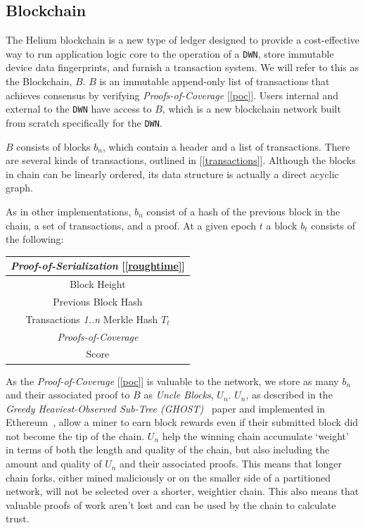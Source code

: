 \documentclass[letterpaper,11pt]{article}
\begin{document}
\subsection{Blockchain}

The Helium blockchain is a new type of ledger designed to provide a cost-effective way to run application logic core to the operation of a \verb|DWN|, store immutable device data fingerprints, and furnish a transaction system. We will refer to this as the Blockchain, $\mathit{B}$. $\mathit{B}$ is an immutable append-only list of transactions that achieves consensus by verifying \emph{Proofs-of-Coverage} [\ref{poc}]. Users internal and external to the \verb|DWN| have access to $\mathit{B}$, which is a new blockchain network built from scratch specifically for the \verb|DWN|.\newline

$\mathit{B}$ consists of blocks $\mathit{b_n}$, which contain a header and a list of transactions. There are several kinds of transactions, outlined in [\ref{transactions}]. Although the blocks in chain can be linearly ordered, its data structure is actually a direct acyclic graph.\newline

As in other implementations, $\mathit{b_n}$ consist of a hash of the previous block in the chain, a set of transactions, and a proof. At a given epoch $\mathit{t}$ a block $\mathit{b_t}$ consists of the following:

\begin{center}
	\begin{tabular}{|c|}
		\hline
		 \emph{Proof-of-Serialization} [\ref{roughtime}]\\
		 \hline
		 Block Height \\
		\hline
		 Previous Block Hash \\
		 \hline
		 Transactions \emph{1..n} Merkle Hash $\mathit{T_t}$ \\
		 \hline
		 \emph{Proofs-of-Coverage} \\
		 \hline
		 Score \\
		 \hline
	\end{tabular}
\end{center}

As the \emph{Proof-of-Coverage} [\ref{poc}] is valuable to the network, we store as many $\mathit{b_n}$ and their associated proof to $\mathit{B}$ as \emph{Uncle Blocks}, $\mathit{U_n}$. $\mathit{U_n}$, as described in the \emph{Greedy Heaviest-Observed Sub-Tree (GHOST)}~\cite{ghost} paper and implemented in Ethereum~\cite{ethereum}, allow a miner to earn block rewards even if their submitted block did not become the tip of the chain. $\mathit{U_n}$ help the winning chain accumulate `weight' in terms of both the length and quality of the chain, but also including the amount and quality of $\mathit{U_n}$ and their associated proofs. This means that longer chain forks, either mined maliciously or on the smaller side of a partitioned network, will not be selected over a shorter, weightier chain. This also means that valuable proofs of work aren't lost and can be used by the chain to calculate trust.\newline
\end{document}
